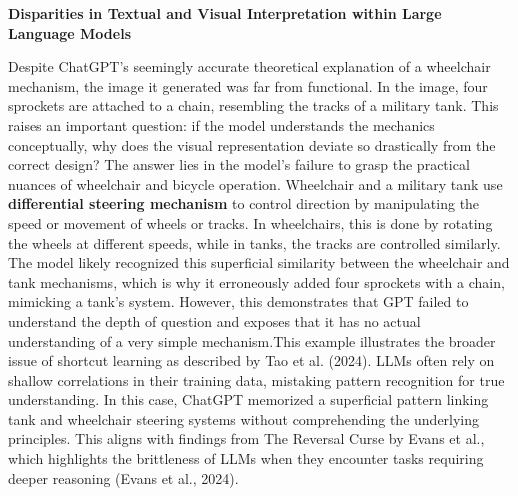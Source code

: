 \documentclass[11pt]{scrartcl}
\begin{document}
\begin{Large}
\textbf{Disparities in Textual and Visual Interpretation within Large Language Models}
\end{Large}
Despite ChatGPT’s seemingly accurate theoretical explanation of a wheelchair mechanism, the image it generated was far from functional. In the image, four sprockets are attached to a chain, resembling the tracks of a military tank. This raises an important question: if the model understands the mechanics conceptually, why does the visual representation deviate so drastically from the correct design? The answer lies in the model's failure to grasp the practical nuances of wheelchair and bicycle operation. Wheelchair and a military tank use \textbf{differential steering mechanism} to control direction by manipulating the speed or movement of wheels or tracks. In wheelchairs, this is done by rotating the wheels at different speeds, while in tanks, the tracks are controlled similarly. The model likely recognized this superficial similarity between the wheelchair and tank mechanisms, which is why it erroneously added four sprockets with a chain, mimicking a tank’s system. However, this demonstrates that GPT failed to understand the depth of question and exposes that it has no actual understanding of a very simple mechanism.This example illustrates the broader issue of shortcut learning as described by Tao et al. (2024)\cite{ref5}. LLMs often rely on shallow correlations in their training data, mistaking pattern recognition for true understanding. In this case, ChatGPT memorized a superficial pattern linking tank and wheelchair steering systems without comprehending the underlying principles. This aligns with findings from The Reversal Curse by Evans et al., which highlights the brittleness of LLMs when they encounter tasks requiring deeper reasoning (Evans et al., 2024)\cite{ref1}.
\end{document}
